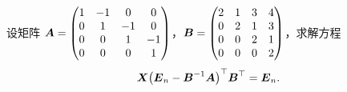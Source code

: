 \begin{example}
    设矩阵 $\vb*{A}=\begin{pmatrix}
            1 & -1 & 0  & 0  \\
            0 & 1  & -1 & 0  \\
            0 & 0  & 1  & -1 \\
            0 & 0  & 0  & 1
        \end{pmatrix}$，$\vb*{B}=\begin{pmatrix}
            2 & 1 & 3 & 4 \\
            0 & 2 & 1 & 3 \\
            0 & 0 & 2 & 1 \\
            0 & 0 & 0 & 2
        \end{pmatrix}$，求解方程
    $$\vb*{X}\qty(\vb*{E}_n-\vb*{B}^{-1}\vb*{A})^{\top}\vb*{B}^{\top}=\vb*{E}_n.$$
\end{example}
